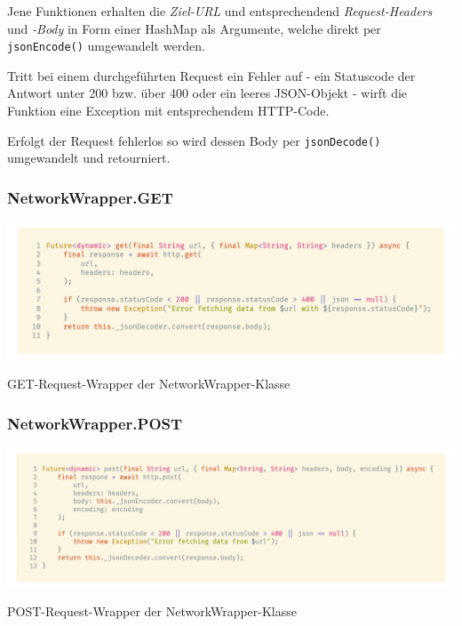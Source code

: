 Jene Funktionen erhalten die \textit{Ziel-URL} und entsprechendend \textit{Request-Headers} und \textit{-Body} in Form einer HashMap
als Argumente, welche direkt per \lstinline{jsonEncode()} umgewandelt werden.

Tritt bei einem durchgeführten Request ein Fehler auf - ein Statuscode der Antwort unter 200 bzw. über 400 oder ein
leeres JSON-Objekt - wirft die Funktion eine Exception mit entsprechendem HTTP-Code.

Erfolgt der Request fehlerlos so wird dessen Body per \lstinline{jsonDecode()} umgewandelt und retourniert.

\subsubsection{NetworkWrapper.GET}

\begin{code}
    \centering
    \includegraphics[width=1\textwidth]{images/Client/util/network-wrapper/networkWrapperGET.png}
    \vspace{-25pt}
    \caption{GET-Request-Wrapper der NetworkWrapper-Klasse}
\end{code}

\subsubsection{NetworkWrapper.POST}

\begin{code}[H]
    \centering
    \includegraphics[width=1\textwidth]{images/Client/util/network-wrapper/networkWrapperPOST.png}
    \vspace{-25pt}
    \caption{POST-Request-Wrapper der NetworkWrapper-Klasse}
\end{code}